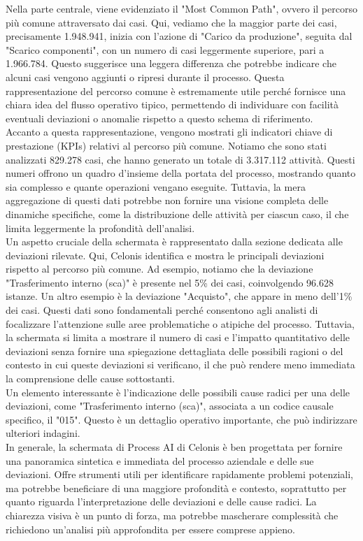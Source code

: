 \documentclass{article}
\begin{document}
Nella parte centrale, viene evidenziato il "Most Common Path", ovvero il percorso più comune attraversato dai casi. Qui, vediamo che la maggior parte dei casi, precisamente 1.948.941, inizia con l'azione di "Carico da produzione", seguita dal "Scarico componenti", con un numero di casi leggermente superiore, pari a 1.966.784. Questo suggerisce una leggera differenza che potrebbe indicare che alcuni casi vengono aggiunti o ripresi durante il processo. Questa rappresentazione del percorso comune è estremamente utile perché fornisce una chiara idea del flusso operativo tipico, permettendo di individuare con facilità eventuali deviazioni o anomalie rispetto a questo schema di riferimento.\\
Accanto a questa rappresentazione, vengono mostrati gli indicatori chiave di prestazione (KPIs) relativi al percorso più comune. Notiamo che sono stati analizzati 829.278 casi, che hanno generato un totale di 3.317.112 attività. Questi numeri offrono un quadro d'insieme della portata del processo, mostrando quanto sia complesso e quante operazioni vengano eseguite. Tuttavia, la mera aggregazione di questi dati potrebbe non fornire una visione completa delle dinamiche specifiche, come la distribuzione delle attività per ciascun caso, il che limita leggermente la profondità dell'analisi.\\
Un aspetto cruciale della schermata è rappresentato dalla sezione dedicata alle deviazioni rilevate. Qui, Celonis identifica e mostra le principali deviazioni rispetto al percorso più comune. Ad esempio, notiamo che la deviazione "Trasferimento interno (sca)" è presente nel 5\% dei casi, coinvolgendo 96.628 istanze. Un altro esempio è la deviazione "Acquisto", che appare in meno dell'1\% dei casi. Questi dati sono fondamentali perché consentono agli analisti di focalizzare l'attenzione sulle aree problematiche o atipiche del processo. Tuttavia, la schermata si limita a mostrare il numero di casi e l'impatto quantitativo delle deviazioni senza fornire una spiegazione dettagliata delle possibili ragioni o del contesto in cui queste deviazioni si verificano, il che può rendere meno immediata la comprensione delle cause sottostanti.\\
Un elemento interessante è l'indicazione delle possibili cause radici per una delle deviazioni, come "Trasferimento interno (sca)", associata a un codice causale specifico, il "015". Questo è un dettaglio operativo importante, che può indirizzare ulteriori indagini.\\
In generale, la schermata di Process AI di Celonis è ben progettata per fornire una panoramica sintetica e immediata del processo aziendale e delle sue deviazioni. Offre strumenti utili per identificare rapidamente problemi potenziali, ma potrebbe beneficiare di una maggiore profondità e contesto, soprattutto per quanto riguarda l'interpretazione delle deviazioni e delle cause radici. La chiarezza visiva è un punto di forza, ma potrebbe mascherare complessità che richiedono un'analisi più approfondita per essere comprese appieno.
\end{document}
